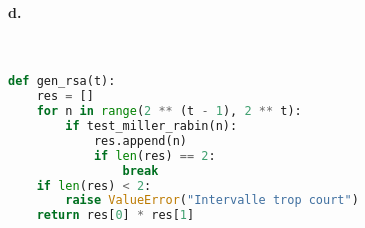 \documentclass[french]{article}
\begin{document}
\paragraph{d.} \
\begin{lstlisting}[language=Python, belowskip=-1 \baselineskip]
def gen_rsa(t):
    res = []
    for n in range(2 ** (t - 1), 2 ** t):
        if test_miller_rabin(n):
            res.append(n)
            if len(res) == 2:
                break
    if len(res) < 2:
        raise ValueError("Intervalle trop court")
    return res[0] * res[1]
\end{lstlisting}
\end{document}
